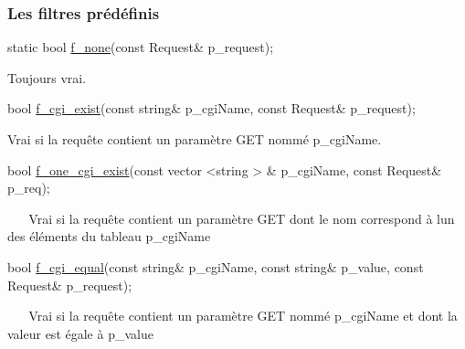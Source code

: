\subsubsection*{Les filtres prédéfinis }


\begin{DoxyItemize}
\item 
\begin{DoxyCode}
\textcolor{keyword}{static} \textcolor{keywordtype}{bool} \hyperlink{classxtd_1_1network_1_1http_1_1Server_a862d3098ef04ad7c503ab4e6d04a93cf}{f\_none}(\textcolor{keyword}{const} Request& p\_request); 
\end{DoxyCode}
 Toujours vrai. ~\newline
~\newline
 ~\newline
~\newline

\item 
\begin{DoxyCode}
\textcolor{keywordtype}{bool} \hyperlink{classxtd_1_1network_1_1http_1_1Server_a90d357c7890d9ca17d5eeb38a33343f6}{f\_cgi\_exist}(\textcolor{keyword}{const} \textcolor{keywordtype}{string}& p\_cgiName, \textcolor{keyword}{const} Request& p\_request); 
\end{DoxyCode}
 Vrai si la requête contient un paramètre G\+ET nommé p\+\_\+cgi\+Name. ~\newline
~\newline
 ~\newline
~\newline

\item 
\begin{DoxyCode}
\textcolor{keywordtype}{bool} \hyperlink{classxtd_1_1network_1_1http_1_1Server_aa66d761aaa278f3123aa11d565475281}{f\_one\_cgi\_exist}(\textcolor{keyword}{const} vector <string > & p\_cgiName, \textcolor{keyword}{const} Request& p\_req); 
\end{DoxyCode}
 ~\newline
~\newline
 Vrai si la requête contient un paramètre G\+ET dont le nom correspond à l\textquotesingle{}un des éléments du tableau p\+\_\+cgi\+Name ~\newline
~\newline

\item 
\begin{DoxyCode}
\textcolor{keywordtype}{bool} \hyperlink{classxtd_1_1network_1_1http_1_1Server_a66975ce2c93998c5e5916ee93ac8bf99}{f\_cgi\_equal}(\textcolor{keyword}{const} \textcolor{keywordtype}{string}& p\_cgiName, \textcolor{keyword}{const} \textcolor{keywordtype}{string}& p\_value, \textcolor{keyword}{const} Request& p\_request); 
\end{DoxyCode}
 ~\newline
~\newline
 Vrai si la requête contient un paramètre G\+ET nommé p\+\_\+cgi\+Name et dont la valeur est égale à p\+\_\+value ~\newline
~\newline


\end{DoxyItemize}
